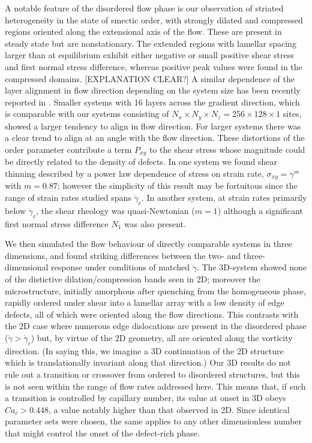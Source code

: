 \documentclass[8.5pt,twoside,twocolumn]{article}
\begin{document}
A notable feature of the disordered flow phase is our observation of striated heterogeneity in the state of smectic order, with strongly dilated and compressed regions oriented along the extensional axis of the flow.  These are present in steady state but are nonstationary. The extended regions with lamellar spacing larger than at equilibrium exhibit either negative or small positive shear stress and first normal stress difference, whereas positive peak values were found in the compressed domains.
[EXPLANATION CLEAR?]
A similar dependence of the layer alignment in flow direction depending on the system size has been recently reported in \cite{Kumaran2011}.
Smaller systems with 16 layers across the gradient direction, which is comparable with our systems consisting of  $N_x\times N_y \times N_z=256\times128\times1$ sites, showed a larger tendency to align in flow direction.
For larger systems there was a clear trend to align at an angle with the flow direction.
These distortions of the order parameter contribute a term $P_{xy}$ to the shear stress whose magnitude could be directly related to the density of defects. In one system we found shear thinning described by a power law dependence of stress on strain rate, $\sigma_{xy}=\gamma^m$ with $m=0.87$; however the simplicity of this result may be fortuitous since the range of strain rates studied spans $\dot\gamma_c$. In another system, at strain rates primarily below $\dot\gamma_c$, the shear rheology was quasi-Newtonian ($m=1$) although a significant first normal stress difference $N_1$ was also present.

We then simulated the flow behaviour of directly comparable systems in three dimensions, and found striking differences between the two- and three-dimensional response under conditions of matched $\dot\gamma$. The 3D-system showed none of the distictive dilation/compression bands seen in 2D; moreover the microstructure, initially amorphous after quenching from the homogeneous phase, rapidly ordered under shear into a lamellar array with a low density of edge defects, all of which were oriented along the flow directions. This contrasts with the 2D case where numerous edge dislocations are present in the disordered phase ($\dot\gamma > \dot\gamma_c$) but, by virtue of the 2D geometry, all are oriented along the vorticity direction. (In saying this, we imagine a 3D continuation of the 2D structure which is translationally invariant along that direction.) Our 3D results do not rule out a transition or crossover from ordered to disordered structures, but this is not seen within the range of flow rates addressed here. This means that, if such a transition is controlled by capillary number, its value at onset in 3D obeys $Ca_c>0.448$, a value notably higher than that observed in 2D. Since identical parameter sets were chosen, the same applies to any other dimensionless number that might control the onset of the defect-rich phase. 
\end{document}
